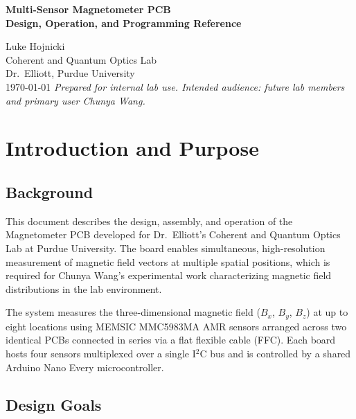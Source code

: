 \documentclass[12pt]{article}
\begin{document}
\begin{titlepage}
  \centering
  \vspace*{2cm}
  {\LARGE\bfseries Multi-Sensor Magnetometer PCB\\[0.4em]
  \large Design, Operation, and Programming Reference\par}
  \vspace{1.5cm}
  {\large Luke Hojnicki\\
  Coherent and Quantum Optics Lab\\
  Dr.\ Elliott, Purdue University\\[0.5em]
  \today}
  \vfill
  \textit{Prepared for internal lab use. Intended audience: future lab members
  and primary user Chunya Wang.}
\end{titlepage}

\tableofcontents
\listoffigures
\listoftables
\newpage

\section{Introduction and Purpose}

\subsection{Background}

This document describes the design, assembly, and operation of the
Magnetometer PCB developed for Dr.\ Elliott's Coherent and Quantum Optics Lab
at Purdue University. The board enables simultaneous, high-resolution
measurement of magnetic field vectors at multiple spatial positions, which is
required for Chunya Wang's experimental work characterizing magnetic field
distributions in the lab environment.

The system measures the three-dimensional magnetic field ($B_x$, $B_y$,
$B_z$) at up to eight locations using MEMSIC MMC5983MA AMR sensors arranged
across two identical PCBs connected in series via a flat flexible cable (FFC).
Each board hosts four sensors multiplexed over a single I$^2$C bus and is
controlled by a shared Arduino Nano Every microcontroller.

\subsection{Design Goals}
\end{document}

